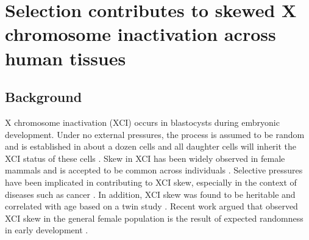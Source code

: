 \chapter{Selection contributes to skewed X chromosome inactivation across human tissues}

\section{Background}
X chromosome inactivation (XCI) occurs in blastocysts during embryonic development. Under no external pressures, the process is assumed to be random and is established in about a dozen cells and all daughter cells will inherit the XCI status of these cells \cite{Takagi1975-es}. Skew in XCI has been widely observed in female mammals and is accepted to be common across individuals \cite{Shvetsova2019-re}. Selective pressures have been implicated in contributing to XCI skew, especially in the context of diseases such as cancer \cite{Brown1999-dc,Migeon1998-gc,Brooks2014-pz}. In addition, XCI skew was found to be heritable and correlated with age based on a twin study \cite{Zito2019-hu}. Recent work argued that observed XCI skew in the general female population is the result of expected randomness in early development \cite{Shvetsova2019-re}. 

